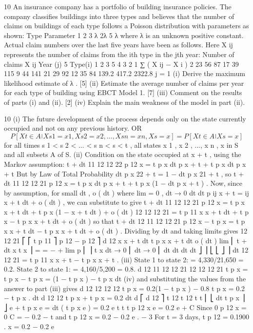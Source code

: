 \documentclass[a4paper,12pt]{article}
\begin{document}
\begin{enumerate}

10
An insurance company has a portfolio of building insurance policies. The company
classifies buildings into three types and believes that the number of claims on
buildings of each type follows a Poisson distribution with parameters as shown:
Type Parameter
1
2
3 λ
2λ
5 λ
where λ is an unknown positive constant.
Actual claim numbers over the last five years have been as follows. Here X ij
represents the number of claims from the ith type in the jth year:
Number of claims X ij
Year (j)
5
Type(i)
1
2
3
5 4 3 2 1 ∑ ( X ij − X i ) 2
23
56
87 17
39
115 9
44
141 21
29
92 12
35
84 139.2
417.2
2322.8
j = 1
(i) Derive the maximum likelihood estimate of λ . [5]
(ii) Estimate the average number of claims per year for each type of building
using EBCT Model 1. [7]
(iii) Comment on the results of parts (i) and (ii). [2]
(iv) Explain the main weakness of the model in part (ii).
\end{enumerate}


10
(i)
The future development of the process depends only on the state currently occupied
and not on any previous history.
OR
\[P [ X t \in A ⏐ X s 1 = x 1 , X s 2 = x 2 , ..., X s n = x n , X s = x ] = P [ X t \in A ⏐ X s = x ]\]
for all times s 1 < s 2 < ... < s n < s < t , all states x 1 , x 2 , ..., x n , x in S and all subsets A of
S.
(ii)
Condition on the state occupied at x + t , using the Markov assumption:
t + dt
11
12
12
22
p 12
x = t p x dt p x + t + t p x dt p x + t
But by Law of Total Probability dt p x 22 + t = 1 − dt p x 21 + t , so
t + dt
11
12
12
21
p 12
x = t p x dt p x + t + t p x (1 − dt p x + t ) .
Now, since by assumption, for small dt ,
o ( dt )
where lim
= 0 ,
dt → 0 dt
dt
p ij x + t = \mu ij x + t dt + o ( dt ) ,
we can substitute to give
t + dt
11 12
12
21
p 12
x = t p x \mu x + t dt + t p x (1 − \mu x + t dt ) + o ( dt )
12
12
12 21
= t p 11
x \mu x + t dt + t p x − t p x \mu x + t dt + o ( dt )
so that
t + dt
12
11 12
12 21
p 12
x − t p x = t p x \mu x + t dt − t p x \mu x + t dt + o ( dt ) .
Dividing by dt and taking limits gives
12
12 21
⎡
⎡ t p 11
⎤
p 12 − p 12 ⎤ d 12
x \mu x + t dt
t p x \mu x + t dt o ( dt )
lim ⎢ t + dt x t x ⎥ =
=
−
+
lim
p
⎢
⎥
t x
dt → 0 ⎢
dt → 0 ⎢
dt
dt
dt
dt ⎦ ⎥
⎣
⎣
⎦ ⎥ dt
12
12 21
= t p 11
x \mu x + t − t p x \mu x + t .
(iii)
State 1 to state 2:  = 4,330/21,650 = 0.2.
State 2 to state 1:  = 4,160/5,200 = 0.8.
d 12
11 12
12 21
12
12
12 21
t p x = t p x \mu − t p x \mu = \mu (1 − t p x ) − t p x \mu
dt
(iv)
and substituting the values from the answer to part (iii) gives
d 12
12
12
12
t p x = 0.2(1 − t p x ) − 0.8 t p x = 0.2 − t p x .
dt
d
12
12
t p x + t p x = 0.2
dt
d
⎡ d 12 ⎤ t
12 t
12 t
t
⎢ ⎣ dt t p x ⎥ ⎦ e + t p x e = dt ( t p x e ) = 0.2 e
t
t
t
p 12
x e = 0.2 e + C
Since 0 p 12
x = 0
C = − 0.2
− t
and t p 12
x = 0.2 − 0.2 e .
− 3
For t = 3 days, t p 12
= 0.1900 .
x = 0.2 − 0.2 e
\end{document}
